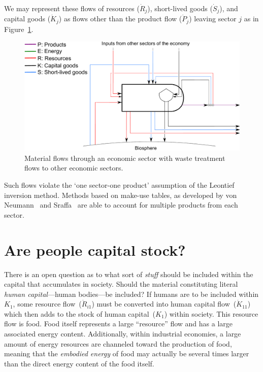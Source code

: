 We may represent these flows of resources ($\dot{R}_{j}$), 
short-lived goods ($\dot{S}_{j}$), and capital goods ($\dot{K}_{j}$)
as flows other than the product flow ($\dot{P}_{j}$)
leaving sector $j$
as in Figure~\ref{fig:PERKS_waste}.

\begin{figure}
	\includegraphics[width=\linewidth]{Part_3/Chapter_Unfinished/images/PERKS_basic_unit_materials_recycle.pdf}
	\caption[Material flows through an economic sector with waste treatment]{Material flows 
					through an economic sector with waste treatment flows to other economic sectors.}
\label{fig:PERKS_waste}
\end{figure}

Such flows violate the `one sector-one product' assumption of the Leontief inversion method.
Methods based on make-use tables,
as developed by von Neumann~\cite{vonNeumann1945} and Sraffa~\cite{Sraffa1960}
are able to account for multiple products from each sector.

\section{Are people capital stock?}
\label{sec:people_as_stock}

There is an open
question as to what sort of \emph{stuff} 
should be included within the capital
that accumulates in society. 
Should the material constituting literal
\emph{human capital}---human bodies---be included? 
If humans are to be included within $K_{1}$, 
some resource flow~($\dot{R}_{i1}$)
must be converted into 
human capital flow~($\dot{K}_{11}$)
which then adds to the stock of human capital~($K_{1}$)
within society.
This resource flow is food.
Food itself represents a large ``resource''
flow and has a large associated energy content. 
Additionally, 
within industrial economies, 
a large amount of energy resources 
are channeled toward the production of food, 
meaning that the \emph{embodied energy}
of food may actually be several times larger than
the direct energy content of the food itself. 

